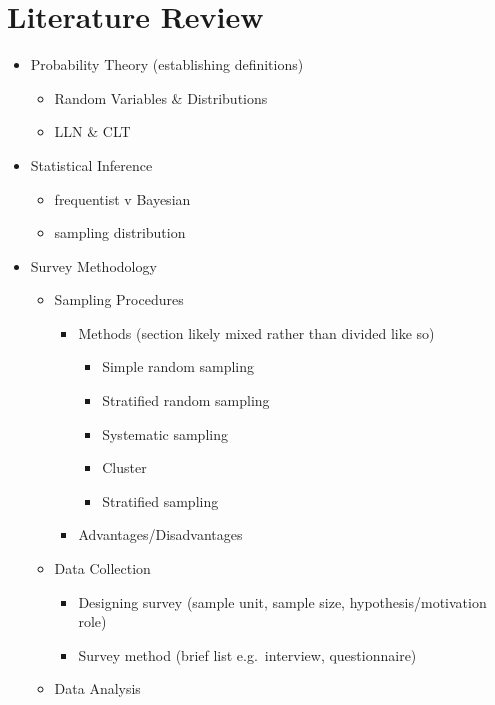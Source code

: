 \documentclass[12pt,twoside]{reedthesis}
\providecommand{\tightlist}{%
  \setlength{\itemsep}{0pt}\setlength{\parskip}{0pt}}
\begin{document}
\hypertarget{lit-review}{%
\chapter{Literature Review}\label{lit-review}}
\begin{itemize}
\tightlist
\item
  Probability Theory (establishing definitions)
  \begin{itemize}
  \tightlist
  \item
    Random Variables \& Distributions
  \item
    LLN \& CLT
  \end{itemize}
\item
  Statistical Inference
  \begin{itemize}
  \tightlist
  \item
    frequentist v Bayesian
  \item
    sampling distribution
  \end{itemize}
\item
  Survey Methodology
  \begin{itemize}
  \tightlist
  \item
    Sampling Procedures
    \begin{itemize}
    \tightlist
    \item
      Methods (section likely mixed rather than divided like so)
      \begin{itemize}
      \tightlist
      \item
        Simple random sampling
      \item
        Stratified random sampling
      \item
        Systematic sampling
      \item
        Cluster
      \item
        Stratified sampling
      \end{itemize}
    \item
      Advantages/Disadvantages
    \end{itemize}
  \item
    Data Collection
    \begin{itemize}
    \tightlist
    \item
      Designing survey (sample unit, sample size, hypothesis/motivation role)
    \item
      Survey method (brief list e.g.~interview, questionnaire)
    \end{itemize}
  \item
    Data Analysis

\end{itemize}
\end{itemize}
\end{document}
